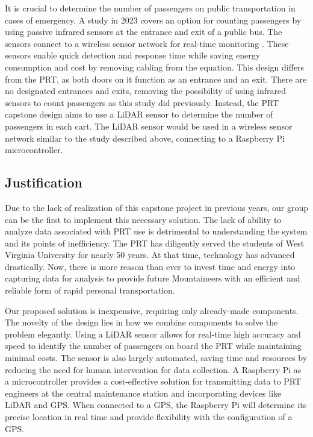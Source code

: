 It is crucial to determine the number of passengers on public transportation in cases of emergency. A study in 2023 covers an option for counting passengers by using passive infrared sensors at the entrance and exit of a public bus. The sensors connect to a wireless sensor network for real-time monitoring \cite{Jurak_Osman_Sikirić_Šimunović_2023}. These sensors enable quick detection and response time while saving energy consumption and cost by removing cabling from the equation. This design differs from the PRT, as both doors on it function as an entrance and an exit. There are no designated entrances and exits, removing the possibility of using infrared sensors to count passengers as this study did previously. Instead, the PRT capstone design aims to use a LiDAR sensor to determine the number of passengers in each cart. The LiDAR sensor would be used in a wireless sensor network similar to the study described above, connecting to a Raspberry Pi microcontroller.

\subsection{Justification}
Due to the lack of realization of this capstone project in previous years, our group can be the first to implement this necessary solution. The lack of ability to analyze data associated with PRT use is detrimental to understanding the system and its points of inefficiency. The PRT has diligently served the students of West Virginia University for nearly 50 years. At that time, technology has advanced drastically. Now, there is more reason than ever to invest time and energy into capturing data for analysis to provide future Mountaineers with an efficient and reliable form of rapid personal transportation.
	
Our proposed solution is inexpensive, requiring only already-made components. The novelty of the design lies in how we combine components to solve the problem elegantly. Using a LiDAR sensor allows for real-time high accuracy and speed to identify the number of passengers on board the PRT while maintaining minimal costs. The sensor is also largely automated, saving time and resources by reducing the need for human intervention for data collection. A Raspberry Pi as a microcontroller provides a cost-effective solution for transmitting data to PRT engineers at the central maintenance station and incorporating devices like LiDAR and GPS. When connected to a GPS, the Raspberry Pi will determine its precise location in real time and provide flexibility with the configuration of a GPS.
